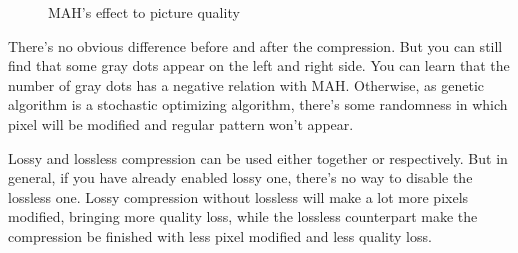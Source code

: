 \documentclass{article}
\begin{document}
\begin{figure}[htbp]
    \centering
    \caption{MAH's effect to picture quality}
\end{figure}

There's no obvious difference before and after the compression. But you can still find that some gray dots appear on the left and right side. You can learn that the number of gray dots has a negative relation with MAH. Otherwise, as genetic algorithm is a stochastic optimizing algorithm, there's some randomness in which pixel will be modified and regular pattern won't appear.

Lossy and lossless compression can be used either together or respectively. But in general, if you have already enabled lossy one, there's no way to disable the lossless one. Lossy compression without lossless will make a lot more pixels modified, bringing more quality loss, while the lossless counterpart make the compression be finished with less pixel modified and less quality loss.
\end{document}
